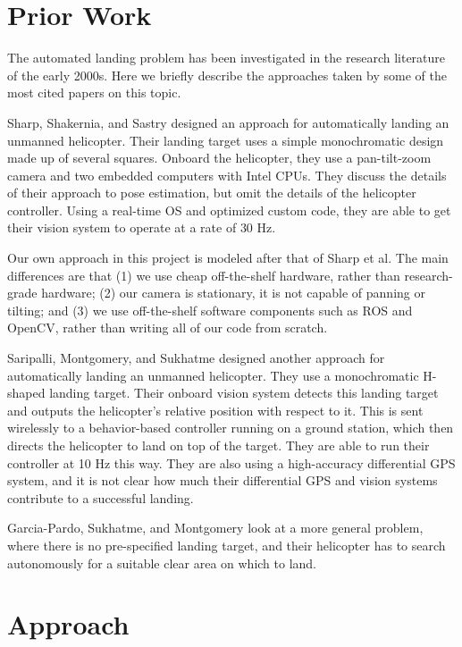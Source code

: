 \documentclass[10pt]{scrartcl} %
\begin{document}
\section{Prior Work}

The automated landing problem has been investigated in the research literature
of the early 2000s. Here we briefly describe the approaches taken by some of
the most cited papers on this topic.

Sharp, Shakernia, and Sastry \cite{sharp_et_al_2001} designed an approach for
automatically landing an unmanned helicopter. Their landing target uses a
simple monochromatic design made up of several squares. Onboard the helicopter,
they use a pan-tilt-zoom camera and two embedded computers with Intel CPUs.
They discuss the details of their approach to pose estimation, but omit the
details of the helicopter controller. Using a real-time OS and optimized custom
code, they are able to get their vision system to operate at a rate of 30 Hz.

Our own approach in this project is modeled after that of Sharp et al. The main
differences are that (1) we use cheap off-the-shelf hardware, rather than
research-grade hardware; (2) our camera is stationary, it is not capable of
panning or tilting; and (3) we use off-the-shelf software components such as
ROS and OpenCV, rather than writing all of our code from scratch.

Saripalli, Montgomery, and Sukhatme \cite{saripalli_et_al_2002} designed
another approach for automatically landing an unmanned helicopter. They use a
monochromatic H-shaped landing target. Their onboard vision system detects this
landing target and outputs the helicopter's relative position with respect to
it. This is sent wirelessly to a behavior-based controller running on a ground
station, which then directs the helicopter to land on top of the target. They
are able to run their controller at 10 Hz this way. They are also using a
high-accuracy differential GPS system, and it is not clear how much their
differential GPS and vision systems contribute to a successful landing.

Garcia-Pardo, Sukhatme, and Montgomery \cite{garcia_pardo_et_al_2002} look at a
more general problem, where there is no pre-specified landing target, and their
helicopter has to search autonomously for a suitable clear area on which to
land.


\section{Approach}
\end{document}
